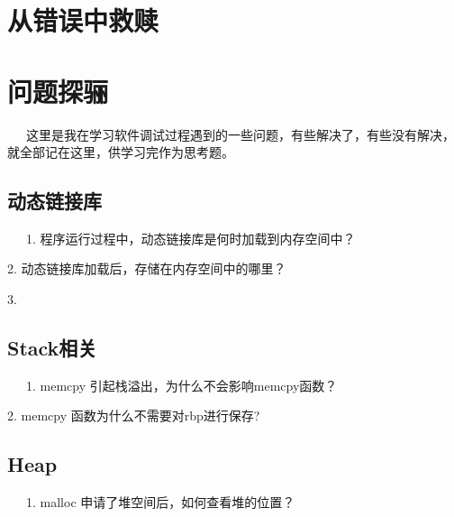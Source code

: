 \documentclass[12pt]{article}  %
\begin{document}
\section{从错误中救赎} %
\label{sec:从错误中救赎}
\section{问题探骊} %
\ \ \ 这里是我在学习软件调试过程遇到的一些问题，有些解决了，有些没有解决，就全部记在这里，供学习完作为思考题。
\label{sec:Latex无极限}
\subsection{动态链接库}
\ \ \ 1. 程序运行过程中，动态链接库是何时加载到内存空间中？\par
2. 动态链接库加载后，存储在内存空间中的哪里？\par
3.  
\subsection{Stack相关}
\ \ \ 1. memcpy 引起栈溢出，为什么不会影响memcpy函数？\par
2. memcpy 函数为什么不需要对rbp进行保存?\par
\subsection{Heap}
\ \ \ 1. malloc 申请了堆空间后，如何查看堆的位置？
\end{document}
